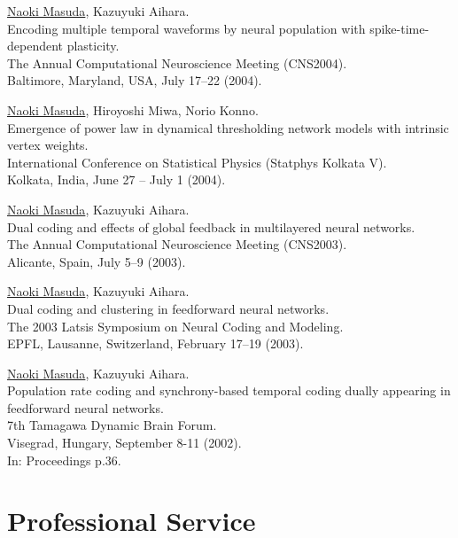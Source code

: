 \documentclass[11pt,letter]{article}
\begin{document}
\begin{etaremune}
\item \underline{Naoki Masuda}, Kazuyuki Aihara.\\
Encoding multiple temporal waveforms by neural population with spike-time-dependent plasticity.\\
The Annual Computational Neuroscience Meeting (CNS2004).\\
Baltimore, Maryland, USA, July 17--22 (2004).

\item \underline{Naoki Masuda}, Hiroyoshi Miwa, Norio Konno.\\
Emergence of power law in dynamical thresholding network models with intrinsic vertex weights.\\
International Conference on Statistical Physics (Statphys Kolkata V).\\
Kolkata, India, June 27 -- July 1 (2004).

\item \underline{Naoki Masuda}, Kazuyuki Aihara.\\
Dual coding and effects of global feedback in multilayered neural networks.\\
The Annual Computational Neuroscience Meeting (CNS2003).\\
Alicante, Spain, July 5--9 (2003).

\item \underline{Naoki Masuda}, Kazuyuki Aihara.\\
Dual coding and clustering in feedforward neural networks.\\
The 2003 Latsis Symposium on Neural Coding and Modeling.\\
EPFL, Lausanne, Switzerland, February 17--19 (2003).

\item \underline{Naoki Masuda}, Kazuyuki Aihara.\\
Population rate coding and synchrony-based temporal coding dually appearing in feedforward neural networks.\\
7th Tamagawa Dynamic Brain Forum.\\
Visegrad, Hungary, September 8-11 (2002).\\
In: Proceedings p.36.

\end{etaremune}


%
%

\section*{\bf Professional Service}
\end{document}
